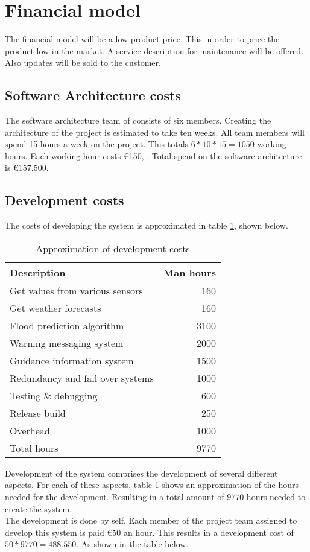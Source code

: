\section{Financial model}
The financial model will be a low product price. This in order to price the product low in the market. A service description for maintenance will be offered. Also updates will be sold to the customer.\\
\subsection{Software Architecture costs}
The software architecture team of \CompanyName consists of six members. Creating the architecture of the project is estimated to take ten weeks. All team members will spend 15 hours a week on the project. This totals $6*10*15=1050$ working hours. Each working hour costs \euro{}150,-. Total spend on the software architecture is \euro{}157.500.
\subsection{Development costs}
The costs of developing the system is approximated in table \ref{table:develop-costs}, shown below.

\begin{table}[H]
	\centering
	\begin{tabular}{lr}
	\toprule
	\textbf{Description} & \multicolumn{1}{l}{\textbf{Man hours}} \\ \hline
	Get values from various sensors & 160 \\ 
	Get weather forecasts & 160 \\ 
	Flood prediction algorithm & 3100 \\ 
	Warning messaging system  & 2000 \\ 
	Guidance information system & 1500 \\ 
	Redundancy and fail over systems & 1000 \\ 
	Testing \& debugging & 600 \\ 
	Release build & 250 \\
	Overhead & 1000 \\ 
	Total hours & 9770 \\
	\bottomrule
	\end{tabular}
	\caption{Approximation of development costs}
	\label{table:develop-costs}
\end{table}

Development of the system comprises the development of several different aspects. For each of these aspects, table \ref{table:develop-costs} shows an approximation of the hours needed for the development. Resulting in a total amount of $9770$ hours needed to create the system.\\
The development is done by \CompanyName self. Each member of the project team assigned to develop this system is paid $\euro{}50$ an hour. This results in a development cost of $50*9770=488.550$. As shown in the table below.

